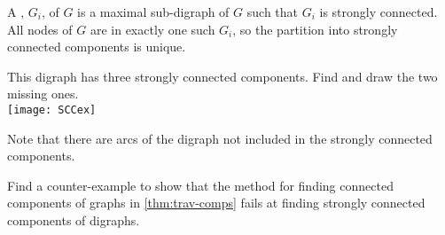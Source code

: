 \begin{Definition} 
A , $G_i$, of $G$ is a maximal sub-digraph of $G$ 
such that $G_i$ is strongly connected. 
All nodes of $G$ are in exactly one such $G_i$, so the partition into strongly connected components is unique.
\end{Definition}

%

\begin{Boxample}[0]\label{eg:scc}
This digraph has three strongly connected components. Find and draw the two missing ones.\\

\texttt{[image: SCCex]}

Note that there are arcs of the digraph not included in the strongly connected components.
\end{Boxample}

\begin{Boxample}[4]
Find a counter-example to show that the method for finding connected components of graphs 
in \cref{thm:trav-comps} fails at finding strongly connected components of digraphs.
\end{Boxample}



%
%


